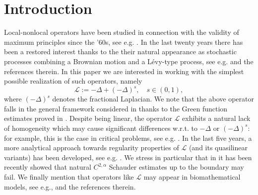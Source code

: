 \documentclass[11pt,a4paper]{amsart}
\theoremstyle{definition}
\theoremstyle{plain}
\numberwithin{equation}{section}
\begin{document}
 \begin{abstract}
In this paper we prove existence and uniqueness of energy solutionns for singular problems with absorption driven by local-nonlocal operators. Moreover, 
we establish a comparison principle \`a la Talenti, leading to a gain of summability result for the solutions of these problems.
 \end{abstract}
 
 \maketitle 
 
\section{Introduction}\label{sec.Intro}
Local-nonlocal operators have been studied in connection with the validity of maximum principles since the '60s, see e.g. \cite{BCP, Cancelier}. In the last twenty years there has been a restored interest thanks to the their natural appearance as stochastic processes combining a Brownian motion and a Lévy-type process, see e.g. \cite{CKSV} and the references therein. In this paper we are interested in working with the simplest possible realization of such operators, namely
\begin{equation*}
	\mathcal{L}:=	-\Delta + (-\Delta)^s, \quad s \in (0,1),
\end{equation*}
\noindent where $(-\Delta)^s$ denotes the fractional Laplacian. We note that the above operator falls in the general framework considered in \cite{BFV} thanks to the Green function estimates proved in \cite{CKSV}. Despite being linear, the operator $\mathcal{L}$ exhibits a natural lack of homogeneity which may cause significant differences w.r.t. to $-\Delta$ or $(-\Delta)^s$: for example, this is the case in critical problems, see e.g. \cite{BDVV5, BiagiVecchi, BiagiVecchi2}.
In the last five years, a more analytical approach towards regularity properties of $\mathcal{L}$ (and its quasilinear variants) has been developed, see e.g. \cite{BDVV, AC, GarainKinnunen, GarainLindgren, DeFMin, SVWZ, BMS, BySo, DiFaZh, AntoCozzi}. We stress in particular that in \cite{SVWZ2} it has been recently showed that natural $C^{2,\alpha}$ Schauder estimates up to the boundary may fail. We finally mention that operators like $\mathcal{L}$ may appear in biomathematical models, see e.g., \cite{DPLV2, DV} and the references therein.
\medskip
\end{document}
